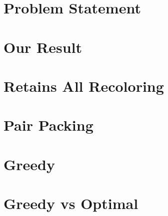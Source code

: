 \documentclass{beamer}
\author{Gilad Kutiel}
\begin{document}


\section{Problem Statement}




\section{Our Result}



\section{Retains All Recoloring}






\section{Pair Packing}





\section{Greedy}





\section{Greedy vs Optimal}







\end{document}
